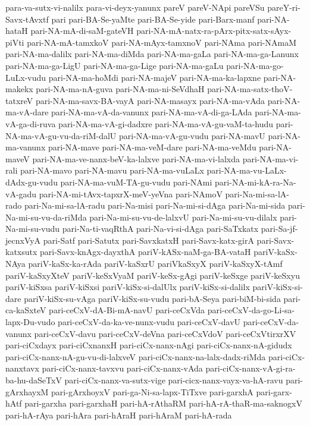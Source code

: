 {para-va-sutx-vi-nalilx
para-vi-deyx-yanunx
pareV
pareV-NApi
pareVSu
pareY-ri-Savx-tAvxtf
pari
pari-BA-Se-yaMte
pari-BA-Se-yide
pari-Barx-manf
pari-NA-hataH
pari-NA-mA-di-saM-gateVH
pari-NA-mA-natx-ra-pArx-pitx-satx-sAyx-piVti
pari-NA-mA-tamxkoV
pari-NA-mAyx-tamxnoV
pari-NAma
pari-NAmaM
pari-NA-ma-dalilx
pari-NA-ma-diMda
pari-NA-ma-gaLa
pari-NA-ma-ga-Lanunx
pari-NA-ma-ga-LigU
pari-NA-ma-ga-Lige
pari-NA-ma-gaLu
pari-NA-ma-go-LuLx-vudu
pari-NA-ma-hoMdi
pari-NA-majeV
pari-NA-ma-ka-lapxne
pari-NA-makekx
pari-NA-ma-nA-guva
pari-NA-ma-ni-SeVdhaH
pari-NA-ma-satx-thoV-tatxreV
pari-NA-ma-savx-BA-vayA
pari-NA-masayx
pari-NA-ma-vAda
pari-NA-ma-vA-dare
pari-NA-ma-vA-da-vanunx
pari-NA-ma-vA-di-ga-LAda
pari-NA-ma-vA-ga-di-ruva
pari-NA-ma-vA-gi-dadxre
pari-NA-ma-vA-gu-vaM-ta-hudu
pari-NA-ma-vA-gu-vu-da-riM-dalU
pari-NA-ma-vA-gu-vudu
pari-NA-mavU
pari-NA-ma-vanunx
pari-NA-mave
pari-NA-ma-veM-dare
pari-NA-ma-veMdu
pari-NA-maveV
pari-NA-ma-ve-nanx-beV-ka-lalxve
pari-NA-ma-vi-lalxda
pari-NA-ma-vi-rali
pari-NA-mavo
pari-NA-mavu
pari-NA-ma-vuLaLx
pari-NA-ma-vu-LaLx-dAdx-gu-vudu
pari-NA-ma-vuM-TA-gu-vudu
pari-NAmi
pari-NA-mi-kA-ra-Na-vA-gadu
pari-NA-mi-tAvx-tapxrX-meV-yeVna
pari-NAmoV
pari-Na-mi-sa-lA-rado
pari-Na-mi-sa-lA-radu
pari-Na-misi
pari-Na-mi-si-dAga
pari-Na-mi-sida
pari-Na-mi-su-vu-da-riMda
pari-Na-mi-su-vu-de-lalxvU
pari-Na-mi-su-vu-dilalx
pari-Na-mi-su-vudu
pari-Na-ti-vaqRthA
pari-Na-vi-si-dAga
pari-SaTxkatx
pari-Sa-jf-jecnxVyA
pari-Satf
pari-Satutx
pari-SavxkatxH
pari-Savx-katx-girA
pari-Savx-katxsutx
pari-Savx-knAgx-dayxthA
pariV-kASx-naM-ga-BA-vataH
pariV-kaSx-NAya
pariV-kaSx-ka-rAda
pariV-kaSxrU
pariVkaSxyX
pariV-kaSxyX-tAmf
pariV-kaSxyXteV
pariV-keSxVyaM
pariV-keSx-gAgi
pariV-keSxge
pariV-keSxyu
pariV-kiSxsa
pariV-kiSxsi
pariV-kiSx-si-dalUlx
pariV-kiSx-si-dalilx
pariV-kiSx-si-dare
pariV-kiSx-su-vAga
pariV-kiSx-su-vudu
pari-bA-Seya
pari-biM-bi-sida
pari-ca-kaSxteV
pari-ceCxV-dA-Bi-mA-navU
pari-ceCxVda
pari-ceCxV-da-go-Li-sa-lapx-Du-vudo
pari-ceCxV-da-ka-ve-nunx-vudu
pari-ceCxV-davU
pari-ceCxV-da-vanunx
pari-ceCxV-davu
pari-ceCxV-deVna
pari-ceCxVdoV
pari-ceCxVtirxrXV
pari-ciCxdayx
pari-ciCxnanxH
pari-ciCx-nanx-nAgi
pari-ciCx-nanx-nA-gidudx
pari-ciCx-nanx-nA-gu-vu-di-lalxveV
pari-ciCx-nanx-na-lalx-dadx-riMda
pari-ciCx-nanxtavx
pari-ciCx-nanx-tavxvu
pari-ciCx-nanx-vAda
pari-ciCx-nanx-vA-gi-ra-ba-hu-daSeTxV
pari-ciCx-nanx-va-sutx-vige
pari-cicx-nanx-vayx-va-hA-ravu
pari-gArxhayxM
pari-gArxhoyxV
pari-ga-Ni-sa-lapx-TiTxve
pari-garxhA
pari-garx-hAtf
pari-garxha
pari-garxhaH
pari-hA-rAthaRM
pari-hA-rA-thaR-ma-saknogxV
pari-hA-rAya
pari-hAra
pari-hAraH
pari-hAraM
pari-hA-rada
}
